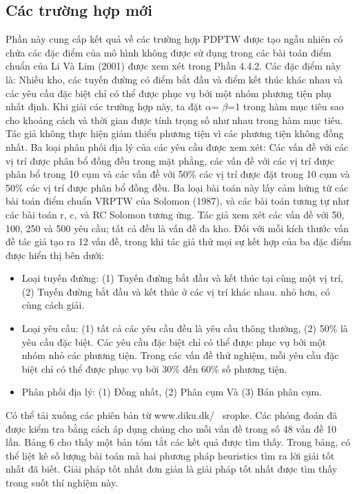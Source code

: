 \subsection{Các trường hợp mới}

Phần này cung cấp kết quả về các trường hợp PDPTW được tạo ngẫu nhiên có chứa các đặc điểm của mô hình không được sử dụng trong các bài toán điểm chuẩn của Li Và Lim (2001) được xem xét trong Phần 4.4.2. Các đặc điểm này là: Nhiều kho, các tuyến đường có điểm bắt đầu và điểm kết thúc khác nhau và các yêu cầu đặc biệt chỉ có thể được phục vụ bởi một nhóm phương tiện phụ nhất định. Khi giải các trường hợp này, ta đặt $\alpha$= $\beta$=1 trong hàm mục tiêu sao cho khoảng cách và thời gian được tính trọng số như nhau trong hàm mục tiêu. Tác giả không thực hiện giảm thiểu phương tiện vì các phương tiện không đồng nhất. 
Ba loại phân phối địa lý của các yêu cầu được xem xét: Các vấn đề với các vị trí được phân bổ đồng đều trong mặt phẳng, các vấn đề với các vị trí được phân bổ trong 10 cụm và các vấn đề với 50\% các vị trí được đặt trong 10 cụm và 50\% các vị trí được phân bổ đồng đều. Ba loại bài toán này lấy cảm hứng từ các bài toán điểm chuẩn VRPTW của Solomon (1987), và các bài toán tương tự như các bài toán r, c, và RC Solomon tương ứng. Tác giả xem xét các vấn đề với 50, 100, 250 và 500 yêu cầu; tất cả đều là vấn đề đa kho. Đối với mỗi kích thước vấn đề tác giả tạo ra 12 vấn đề, trong khi tác giả thử mọi sự kết hợp của ba đặc điểm được hiển thị bên dưới:
\begin{itemize}
    \item Loại tuyến đường: (1) Tuyến đường bắt đầu và kết thúc tại cùng một vị trí, (2) Tuyến đường bắt đầu và kết thúc ở các vị trí khác nhau.
    nhỏ hơn, có cùng cách giải.
    \item Loại yêu cầu: (1) tất cả các yêu cầu đều là yêu cầu thông thường, (2) 50\% là yêu cầu đặc biệt. Các yêu cầu đặc biệt chỉ có thể được phục vụ bởi một nhóm nhỏ các phương tiện. Trong các vấn đề thử nghiệm, mỗi yêu cầu đặc biệt chỉ có thể được phục vụ bởi 30\% đến 60\% số phương tiện.
    \item Phân phối địa lý: (1) Đồng nhất, (2) Phân cụm Và (3) Bán phân cụm.
\end{itemize}
Có thể tải xuống các phiên bản từ www.diku.dk/ ~sropke. Các phỏng đoán đã được kiểm tra bằng cách áp dụng chúng cho mỗi vấn đề trong số 48 vấn đề 10 lần. Bảng 6 cho thấy một bản tóm tắt các kết quả được tìm thấy. Trong bảng, có thể liệt kê số lượng bài toán mà hai phương pháp heuristics tìm ra lời giải tốt nhất đã biết. Giải pháp tốt nhất đơn giản là giải pháp tốt nhất được tìm thấy trong suốt thí nghiệm này.


